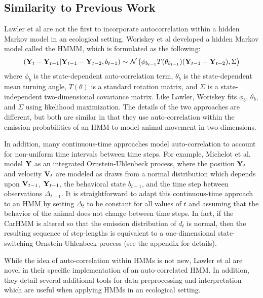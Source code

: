 \subsection{Similarity to Previous Work}

Lawler et al are not the first to incorporate autocorrelation within a hidden Markov model in an ecological setting. Woriskey et al \cite{Whoriskey:2016} developed a hidden Markov model called the HMMM, which is formulated as the following:
%
$$\left(\mathbf{Y}_t - \mathbf{Y}_{t-1} |\mathbf{Y}_{t-1} - \mathbf{Y}_{t-2}, b_{t-1}\right) \sim \mathcal{N}\left( \phi_{b_{t-1}} T(\theta_{b_{t-1}})(\mathbf{Y}_{t-1} - \mathbf{Y}_{t-2}),\Sigma\right)$$
%
where $\phi_b$ is the state-dependent auto-correlation term, $\theta_b$ is the state-dependent mean turning angle, $T(\theta)$ is a standard rotation matrix, and $\Sigma$ is a state-independent two-dimensional covariance matrix. Like Lawler, Woriskey fits $\phi_b$, $\theta_b$, and $\Sigma$ using likelihood maximization. The details of the two approaches are different, but both are similar in that they use auto-correlation within the emission probabilities of an HMM to model animal movement in two dimensions.

In addition, many continuous-time approaches model auto-correlation to account for non-uniform time intervals between time steps. For example, Michelot et al. \cite{Michelot:2019} model $\mathbf{Y}$ as an integrated Ornstein-Uhlenbeck process, where the position $\mathbf{Y}_t$ and velocity $\mathbf{V}_t$ are modeled as draws from a normal distribution which depends upon $\mathbf{V}_{t-1}$, $\mathbf{Y}_{t-1}$, the behavioral state $b_{t-1}$, and the time step between observations $\Delta_{t-1}$. It is straightforward to adapt this continuous-time approach to an HMM by setting $\Delta_{t}$ to be constant for all values of $t$ and assuming that the behavior of the animal does not change between time steps. In fact, if the CarHMM is altered so that the emission distribution of $d_t$ is normal, then the resulting sequence of step-lengths is equivalent to a one-dimensional state-switching Ornstein-Uhlenbeck process (see the appendix for details).

While the idea of auto-correlation within HMMs is not new, Lawler et al are novel in their specific implementation of an auto-correlated HMM. In addition, they detail several additional tools for data preprocessing and interpretation which are useful when applying HMMs in an ecological setting.

\fi